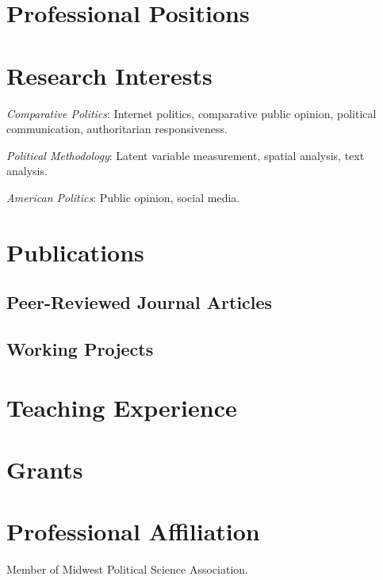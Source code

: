 \documentclass[10.5pt,]{article}
\providecommand{\tightlist}{%
	\setlength{\itemsep}{0pt}\setlength{\parskip}{0pt}}
\renewenvironment{itemize}{
	\begin{list}{}{
			\setlength{\leftmargin}{1.5em}
		}
	}{
	\end{list}
}
\begin{document}
\section{Professional Positions}\label{professional-positions}

\section{Research Interests}\label{research-interests}

\begin{itemize}
\tightlist
\item
  \emph{Comparative Politics}: Internet politics, comparative public
  opinion, political communication, authoritarian responsiveness.
\item
  \emph{Political Methodology}: Latent variable measurement, spatial
  analysis, text analysis.
\item
  \emph{American Politics}: Public opinion, social media.
\end{itemize}

\section{Publications}\label{publications}

\subsection{Peer-Reviewed Journal
Articles}\label{peer-reviewed-journal-articles}

\subsection{Working Projects}\label{working-projects}

\section{Teaching Experience}\label{teaching-experience}

\section{Grants}\label{grants}

\section{Professional Affiliation}\label{professional-affiliation}

\begin{itemize}
\tightlist
\item
  Member of Midwest Political Science Association.
\end{itemize}
	
			
\end{document}
